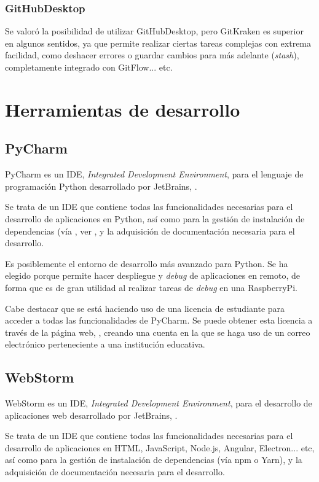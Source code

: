 \subsubsection{GitHubDesktop}
Se valoró la posibilidad de utilizar GitHubDesktop, pero GitKraken es superior en algunos sentidos, ya que permite realizar ciertas tareas complejas con extrema facilidad, como deshacer errores o guardar cambios para más adelante (\textit{stash}), completamente integrado con GitFlow... etc.

\section{Herramientas de desarrollo}

\subsection{PyCharm}

PyCharm es un IDE, \textit{Integrated Development Environment}, para el lenguaje de programación Python desarrollado por JetBrains, \citep{wiki:PyCharm}. 

Se trata de un IDE que contiene todas las funcionalidades necesarias para el desarrollo de aplicaciones en Python, así como para la gestión de instalación de dependencias (vía , ver \citep{wiki:PyPa}, y la adquisición de documentación necesaria para el desarrollo. 

Es posiblemente el entorno de desarrollo más avanzado para Python. Se ha elegido porque permite hacer despliegue y \emph{debug} de aplicaciones en remoto, de forma que es de gran utilidad al realizar tareas de \emph{debug} en una RaspberryPi.

Cabe destacar que se está haciendo uso de una licencia de estudiante para acceder a todas las funcionalidades de PyCharm. Se puede obtener esta licencia a través de la página web, \citep{wiki:PyCharm}, creando una cuenta en la que se haga uso de un correo electrónico perteneciente a una institución educativa. 


\subsection{WebStorm}

WebStorm es un IDE, \textit{Integrated Development Environment}, para el desarrollo de aplicaciones web desarrollado por JetBrains, \citep{wiki:WebStorm}. 

Se trata de un IDE que contiene todas las funcionalidades necesarias para el desarrollo de aplicaciones en HTML, JavaScript, Node.js, Angular, Electron... etc, así como para la gestión de instalación de dependencias (vía npm o Yarn), y la adquisición de documentación necesaria para el desarrollo. 

